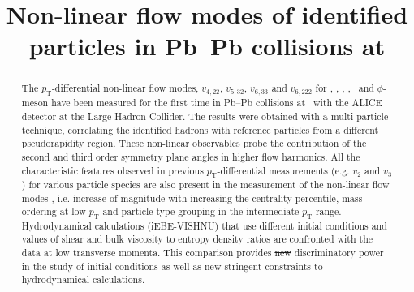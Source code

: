 \documentclass[ALICE,manyauthors]{cernphprep}
\providecommand{\DIFaddtex}[1]{{\protect\color{blue}\uwave{#1}}} %
\providecommand{\DIFdeltex}[1]{{\protect\color{red}\sout{#1}}}                      %
\providecommand{\DIFaddbegin}{} %
\providecommand{\DIFaddend}{} %
\providecommand{\DIFdelbegin}{} %
\providecommand{\DIFdelend}{} %
\providecommand{\DIFadd}[1]{\texorpdfstring{\DIFaddtex{#1}}{#1}} %
\providecommand{\DIFdel}[1]{\texorpdfstring{\DIFdeltex{#1}}{}} %
\begin{document}
\newcommand{\red}[1]{{\color{red}{#1}}}

\newcommand{\minv}{${\it M}_{\rm{inv}}$}

\begin{titlepage}

\title{Non-linear flow modes of identified particles in Pb--Pb collisions at \sNN}


\begin{abstract}
\noindent The $p_{\mathrm{T}}$-differential non-linear flow modes, $v_{4,22}$, $v_{5,32}$, $v_{6,33}$ and $v_{6,222}$ for \pion, \kaon, \Ks, \proton, \lambdas~and $\phi$-meson have been measured for the first time in Pb--Pb collisions at \sNN~with the ALICE detector at the Large Hadron Collider. The results were obtained with a multi-particle technique, correlating the identified hadrons with reference particles from a different pseudorapidity region. %
These non-linear observables probe the contribution of the second and third order symmetry plane angles in higher flow harmonics. All the characteristic features observed in previous $p_{\mathrm{T}}$-differential measurements (e.g. $v_{2}$ and $v_{3}$) for various particle species are also present in the measurement of the non-linear flow modes , i.e. increase of magnitude with increasing the centrality percentile, mass ordering at low $p_{\mathrm{T}}$ and particle type grouping in the intermediate $p_{\mathrm{T}}$ range. Hydrodynamical calculations (iEBE-VISHNU) that use different initial conditions and values of shear and bulk viscosity to entropy density ratios are confronted with the data at low transverse momenta. This comparison provides \DIFdelbegin \DIFdel{new }\DIFdelend \DIFaddbegin \DIFadd{additional }\DIFaddend discriminatory power in the study of initial conditions as well as new stringent constraints to hydrodynamical calculations.


\end{abstract}
\end{titlepage}
\end{document}
